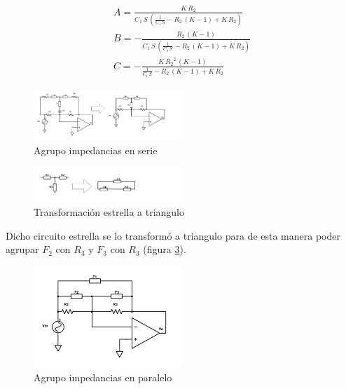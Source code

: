 \documentclass[../../tc_tp3_main.tex]{subfiles}
\begin{document}
\begin{gather}
   A=\frac{K\, R_{2}}{C_{1}\, S\, \left(\frac{1}{C_{1}\, S} - R_{2}\, \left(K - 1\right) + K\, R_{2}\right)} \\
B=-\frac{R_{2}\, \left(K - 1\right)}{C_{1}\, S\, \left(\frac{1}{C_{1}\, S} - R_{2}\, \left(K - 1\right) + K\, R_{2}\right)}\\
C=-\frac{K\, {R_{2}}^2\, \left(K - 1\right)}{\frac{1}{C_{1}\, S} - R_{2}\, \left(K - 1\right) + K\, R_{2}}
\end{gather}


\begin{figure}[H]
\centering
\includegraphics[width=0.5\textwidth]{imagenes/simpl2.png}
\caption{Agrupo impedancias en serie} \label{fig:cs2}
\end{figure}


\begin{figure}[H]
\centering
\includegraphics[width=0.5\textwidth]{imagenes/simpl3.png}
\caption{Transformación estrella a triangulo} \label{fig:cs3}
\end{figure}

Dicho circuito estrella se lo transformó a triangulo para de esta manera poder agrupar $F_2$ con $R_3$ y $F_3$ con $R_3$ (figura \ref{fig:cs4}).




\begin{figure}[H]
\centering
\includegraphics[width=0.5\textwidth]{imagenes/simpl4.png}
\caption{Agrupo impedancias en paralelo} \label{fig:cs4}
\end{figure}
\end{document}
